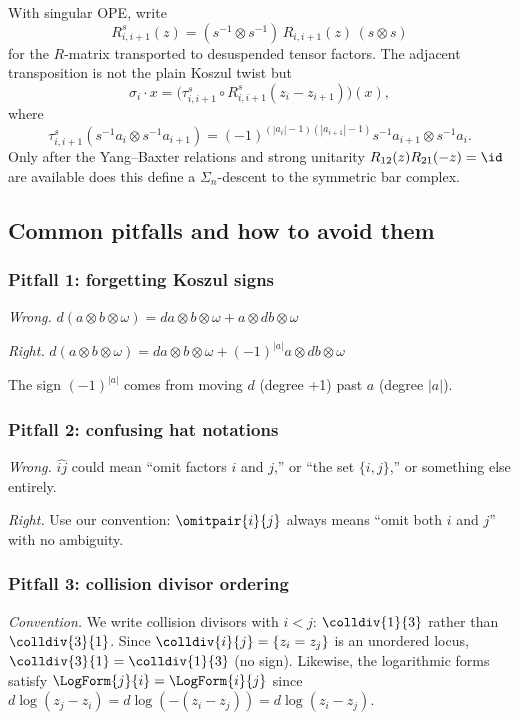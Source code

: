 With singular OPE, write
\[
R^s_{i,i+1}(z)=(s^{-1}\otimes s^{-1})\,
R_{i,i+1}(z)\,(s\otimes s)
\]
for the $R$-matrix transported to desuspended tensor factors. The
adjacent transposition is not the plain Koszul twist but
\[
\sigma_i\cdot x
=\bigl(\tau^{s}_{i,i+1}\circ R^s_{i,i+1}(z_i-z_{i+1})\bigr)(x),
\]
where
\[
\tau^{s}_{i,i+1}
(s^{-1}a_i\otimes s^{-1}a_{i+1})
=(-1)^{(|a_i|-1)(|a_{i+1}|-1)}
s^{-1}a_{i+1}\otimes s^{-1}a_i.
\]
Only after the Yang--Baxter relations and strong unitarity
$R_{12}(z)R_{21}(-z)=\id$ are available does this define a
$\Sigma_n$-descent to the symmetric bar complex.

\subsection{Common pitfalls and how to avoid them}

\subsubsection{Pitfall 1: forgetting Koszul signs}

\emph{Wrong.} $d(a \otimes b \otimes \omega) = da \otimes b \otimes \omega + a \otimes db \otimes \omega$

\emph{Right.} $d(a \otimes b \otimes \omega) = da \otimes b \otimes \omega + (-1)^{|a|} a \otimes db \otimes \omega$

The sign $(-1)^{|a|}$ comes from moving $d$ (degree +1) past $a$ (degree $|a|$).

\subsubsection{Pitfall 2: confusing hat notations}

\emph{Wrong.} $\widehat{ij}$ could mean ``omit factors $i$ and $j$,'' or ``the set $\{i, j\}$,'' or something else entirely.

\emph{Right.} Use our convention: $\omitpair{i}{j}$ always means ``omit both $i$ and $j$'' with no ambiguity.

\subsubsection{Pitfall 3: collision divisor ordering}

\emph{Convention.} We write collision divisors with $i < j$: $\colldiv{1}{3}$ rather than $\colldiv{3}{1}$. Since $\colldiv{i}{j} = \{z_i = z_j\}$ is an unordered locus, $\colldiv{3}{1} = \colldiv{1}{3}$ (no sign). Likewise, the logarithmic forms satisfy $\LogForm{j}{i} = \LogForm{i}{j}$ since $d\log(z_j - z_i) = d\log(-(z_i - z_j)) = d\log(z_i - z_j)$.

